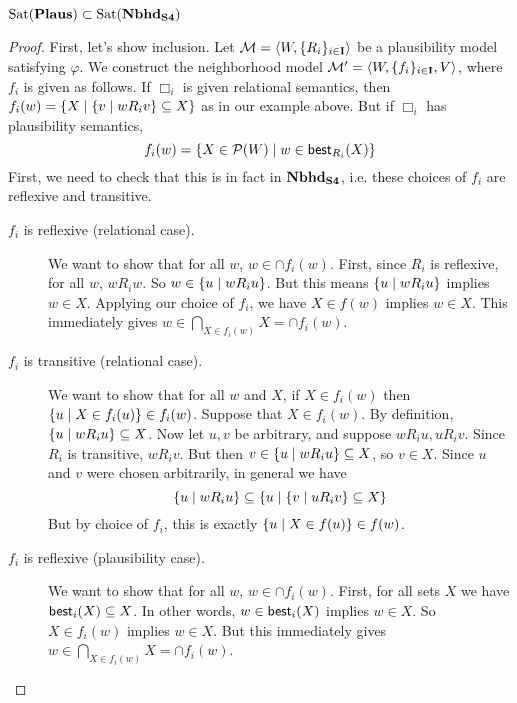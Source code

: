 \documentclass[letterpaper]{article}
\begin{document}

\begin{proposition}
    $\mathrm{Sat}( \textrm{\textbf{Plaus}} ) \subset \mathrm{Sat}( \textrm{\textbf{Nbhd}}_\textrm{\textbf{S4}} )$
\end{proposition}
\begin{proof}
    First, let's show inclusion.  Let $\mathcal{M} = \langle W, \{ R_i \}_{i \in \textbf{I}} \rangle$ be a plausibility model satisfying $\varphi$.  We construct the neighborhood model $\mathcal{M}' = \langle W, \{ f_i \}_{i \in \textbf{I}}, V \rangle$, where $f_i$ is given as follows.  If $\Box_i$ is given relational semantics, then $f_i(w) = \{ X \mid \{ v \mid w{R_i}v  \}\subseteq X \}$ as in our example above.  But if $\Box_i$ has plausibility semantics,
    \[
        f_i(w) = \{ X \in \mathcal{P}(W) \mid w \in \mathsf{best}_{R_i}(X) \}
    \]
    First, we need to check that this is in fact in $\textrm{\textbf{Nbhd}}_\textrm{\textbf{S4}}$, i.e. these choices of $f_i$ are reflexive and transitive.
    \begin{description}
        \item[$f_i$ is reflexive (relational case).]
        We want to show that for all $w$, $w \in \cap f_i(w)$.  First, since $R_i$ is reflexive, for all $w$, $w{R_i}w$.  So $w \in \{ u \mid w{R_i}u \}$.  But this means $\{ u \mid w{R_i}u \}$ implies $w \in X$.  Applying our choice of $f_i$, we have $X \in f(w)$ implies $w \in X$.  This immediately gives $w \in \bigcap_{X \in f_i(w)} X = \cap f_i(w)$.

        \item[$f_i$ is transitive (relational case).]
        We want to show that for all $w$ and $X$, if $X \in f_i(w)$ then $\{ u \mid X \in f_i(u) \} \in f_i(w)$.  Suppose that $X \in f_i(w)$.  By definition, $\{ u \mid w{R_i}u \} \subseteq X$.  Now let $u, v$ be arbitrary, and suppose $w{R_i}u, u{R_i}v$.  Since $R_i$ is transitive, $w{R_i}v$.  But then $v \in \{ u \mid w{R_i}u \} \subseteq X$, so $v \in X$.  Since $u$ and $v$ were chosen arbitrarily, in general we have
        \[
            \{ u \mid w{R_i}u \} \subseteq \{ u \mid \{ v \mid u{R_i}v \} \subseteq X \}
        \]
        But by choice of $f_i$, this is exactly $\{ u \mid X \in f(u) \} \in f(w)$.

        \item[$f_i$ is reflexive (plausibility case).]
        We want to show that for all $w$, $w \in \cap f_i(w)$.  First, for all sets $X$ we have $\mathsf{best}_i(X) \subseteq X$.  In other words, $w \in \mathsf{best}_i(X)$ implies $w \in X$.  So $X \in f_i(w)$ implies $w \in X$.  But this immediately gives $w \in \bigcap_{X \in f_i(w)} X = \cap f_i(w)$.


\end{description}
\end{proof}
\end{document}
